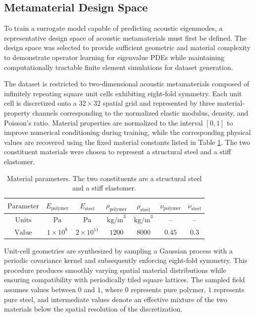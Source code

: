 \documentclass[preprint,review,12pt,numafflabel]{elsarticle}
\begin{document}
\subsection{Metamaterial Design Space}
\label{ssec:metamaterial_design_space}
To train a surrogate model capable of predicting acoustic eigenmodes, a representative design space of acoustic metamaterials must first be defined. The design space was selected to provide sufficient geometric and material complexity to demonstrate operator learning for eigenvalue PDEs while maintaining computationally tractable finite element simulations for dataset generation.

The dataset is restricted to two-dimensional acoustic metamaterials composed of infinitely repeating square unit cells exhibiting eight-fold symmetry. Each unit cell is discretized onto a $32\times32$ spatial grid and represented by three material-property channels corresponding to the normalized elastic modulus, density, and Poisson's ratio. Material properties are normalized to the interval $[0,1]$ to improve numerical conditioning during training, while the corresponding physical values are recovered using the fixed material constants listed in Table \ref{tab:parameter_ranges}. The two constituent materials were chosen to represent a structural steel and a stiff elastomer.

\begin{table}[h]
  \centering
  \begin{tabular}{|c|c|c|c|c|c|c|}
    \hline
    $\text{Parameter}$ & $E_{\text{polymer}}$ & $E_{\text{steel}}$ & $\rho_{\text{polymer}}$ & $\rho_{\text{steel}}$ & $\nu_{\text{polymer}}$ & $\nu_{\text{steel}}$ \\
    \hline
    $\text{Units}$ & $\text{Pa}$ & $\text{Pa}$ & $\text{kg/m}^3$ & $\text{kg/m}^3$ & -- & -- \\
    \hline
    $\text{Value}$ & $1 \times 10^{8}$ & $2 \times 10^{11}$ & $1200$ & $8000$ & $0.45$ & $0.3$ \\
    \hline
  \end{tabular}
  \caption{Material parameters. The two constituents are a structural steel and a stiff elastomer.}
  \label{tab:parameter_ranges}
\end{table}

Unit-cell geometries are synthesized by sampling a Gaussian process with a periodic covariance kernel and subsequently enforcing eight-fold symmetry. This procedure produces smoothly varying spatial material distributions while ensuring compatibility with periodically tiled square lattices. The sampled field assumes values between $0$ and $1$, where $0$ represents pure polymer, $1$ represents pure steel, and intermediate values denote an effective mixture of the two materials below the spatial resolution of the discretization.
\end{document}
